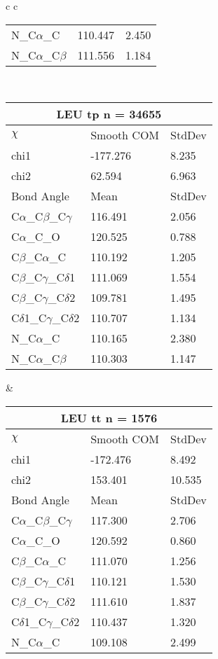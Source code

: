 \begin{longtable}{ c c }
\begin{tabular}{ l l l }
  N\_C$\alpha$\_C & 110.447 & 2.450\\
  N\_C$\alpha$\_C$\beta$ & 111.556 & 1.184\\
  \bottomrule
  \end{tabular}
  \\
  \begin{tabular}{ l l l }
  \toprule
  \multicolumn{3}{c}{LEU \textbf{tp} n = 34655} \\ \toprule
  $\chi$       & Smooth COM & StdDev \\ \midrule
  chi1 & -177.276 & 8.235 \\ 
  chi2 & 62.594 & 6.963 \\ \midrule
  Bond Angle   & Mean     & StdDev \\ \midrule
  C$\alpha$\_C$\beta$\_C$\gamma$ & 116.491 & 2.056\\
  C$\alpha$\_C\_O & 120.525 & 0.788\\
  C$\beta$\_C$\alpha$\_C & 110.192 & 1.205\\
  C$\beta$\_C$\gamma$\_C$\delta$1 & 111.069 & 1.554\\
  C$\beta$\_C$\gamma$\_C$\delta$2 & 109.781 & 1.495\\
  C$\delta$1\_C$\gamma$\_C$\delta$2 & 110.707 & 1.134\\
  N\_C$\alpha$\_C & 110.165 & 2.380\\
  N\_C$\alpha$\_C$\beta$ & 110.303 & 1.147\\
  \bottomrule
  \end{tabular}
  &
  \begin{tabular}{ l l l }
  \toprule
  \multicolumn{3}{c}{LEU \textbf{tt} n = 1576} \\ \toprule
  $\chi$       & Smooth COM & StdDev \\ \midrule
  chi1 & -172.476 & 8.492 \\ 
  chi2 & 153.401 & 10.535 \\ \midrule
  Bond Angle   & Mean     & StdDev \\ \midrule
  C$\alpha$\_C$\beta$\_C$\gamma$ & 117.300 & 2.706\\
  C$\alpha$\_C\_O & 120.592 & 0.860\\
  C$\beta$\_C$\alpha$\_C & 111.070 & 1.256\\
  C$\beta$\_C$\gamma$\_C$\delta$1 & 110.121 & 1.530\\
  C$\beta$\_C$\gamma$\_C$\delta$2 & 111.610 & 1.837\\
  C$\delta$1\_C$\gamma$\_C$\delta$2 & 110.437 & 1.320\\
  N\_C$\alpha$\_C & 109.108 & 2.499\\

\end{tabular}
\end{longtable}
